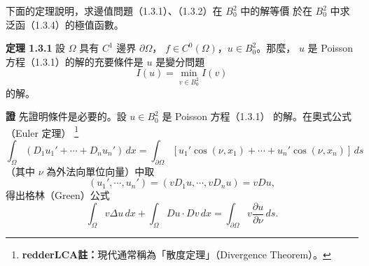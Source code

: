\documentclass[11pt,a4paper,twoside]{article}
\newif\ifstudynotes
\newcommand{\ImportantNote}[2]{%
    \ifstudynotes
    \begin{importantNote}[title={#1}]
    #2
    \end{importantNote}
    \fi
}
\newcommand{\pnum}[1]{%
    \makebox[0pt][r]{%
        \scriptsize\textbf{[#1]}\hspace{0.7em}%
    }%
}
\begin{document}
\noindent
\pnum{16}
下面的定理說明，求邊值問題（1.3.1）、（1.3.2）在 $B_0^2$ 中的解等價
於在 $B_0^2$ 中求泛函（1.3.4）的極值函數。

\vspace{0.5em}

\noindent
\pnum{17}
\textbf{定理 1.3.1}\qquad
設 $\Omega$ 具有 $C^1$ 邊界 $\partial\Omega$，
$f\in C^0(\Omega)$，$u\in B_0^2$。那麼，
$u$ 是 Poisson 方程（1.3.1）的解的充要條件是 $u$ 是變分問題
\begin{equation}
    I(u)
    =
    \min_{v\in B_0^2} I(v)
    \tag{1.3.5}
\end{equation}
的解。

\ImportantNote{重要觀念：Poisson 方程與變分問題的等價}{
    這個定理是本節的核心：

    \[
        -\Delta u=f,\qquad u|_{\partial\Omega}=0
    \]

    與

    \[
        I(u)=\min_{v\in B_0^2}I(v)
    \]

    在這裡是等價的。

    也就是說，同一個 $u$ 可以用兩種角度描述：

    \[
        \boxed{
            \begin{array}{c}
                \text{微分方程觀點：解 Poisson 方程} \\[2mm]
                \Updownarrow               \\[2mm]
                \text{變分觀點：找使能量 }I\text{ 最小的函數}
            \end{array}}
    \]

    這也是後面把 PDE 轉成變分問題、再進一步討論弱解的重要起點。
}

\vspace{0.4em}

\noindent
\pnum{18}
\textbf{證}\qquad
先證明條件是必要的。設 $u\in B_0^2$ 是 Poisson 方程（1.3.1）
的解。在奧式公式（Euler 定理）%
\footnote{\textbf{redderLCA註：}現代通常稱為「散度定理」（Divergence Theorem）。}
\begin{equation}
    \int_{\Omega}
    \left(
    D_1u_1'+\cdots+D_nu_n'
    \right)\,dx
    =
    \int_{\partial\Omega}
    \left[
        u_1'\cos(\nu,x_1)+\cdots+u_n'\cos(\nu,x_n)
        \right]\,ds
    \tag{1.3.6}
\end{equation}
（其中 $\nu$ 為外法向單位向量）中取
\[
    (u_1',\cdots,u_n')
    =
    (vD_1u,\cdots,vD_nu)
    =
    vDu,
\]
得出格林（Green）公式
\begin{equation}
    \int_{\Omega}v\Delta u\,dx
    +
    \int_{\Omega}Du\cdot Dv\,dx
    =
    \int_{\partial\Omega}
    v\frac{\partial u}{\partial\nu}\,ds.
    \tag{1.3.7}
\end{equation}
\end{document}
